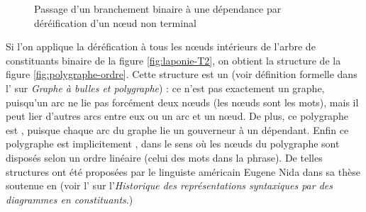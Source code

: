 \begin{figure}


\caption{\label{fig:dereification}Passage d’un branchement binaire à une dépendance par déréification d’un nœud non terminal}
\end{figure}

Si l’on applique la déréfication à tous les nœuds intérieurs de l’arbre de constituants binaire de la figure \ref{fig:laponie-T2}, on obtient la structure de la figure \ref{fig:polygraphe-ordre}. Cette structure est un  (voir définition formelle dans l’ sur \textit{Graphe à bulles et polygraphe}) : ce n’est pas exactement un graphe, puisqu’un arc ne lie pas forcément deux nœuds (les nœuds sont les mots), mais il peut lier d’autres arcs entre eux ou un arc et un nœud. De plus, ce polygraphe est , puisque chaque arc du graphe lie un gouverneur à un dépendant. Enfin ce polygraphe est implicitement , dans le sens où les nœuds du polygraphe sont disposés selon un ordre linéaire (celui des mots dans la phrase). De telles structures ont été proposées par le linguiste américain Eugene Nida dans sa thèse soutenue en \citeyear{nida1943morphology} (voir l’ sur l’\textit{Historique des représentations syntaxiques par des diagrammes en constituants}.)

